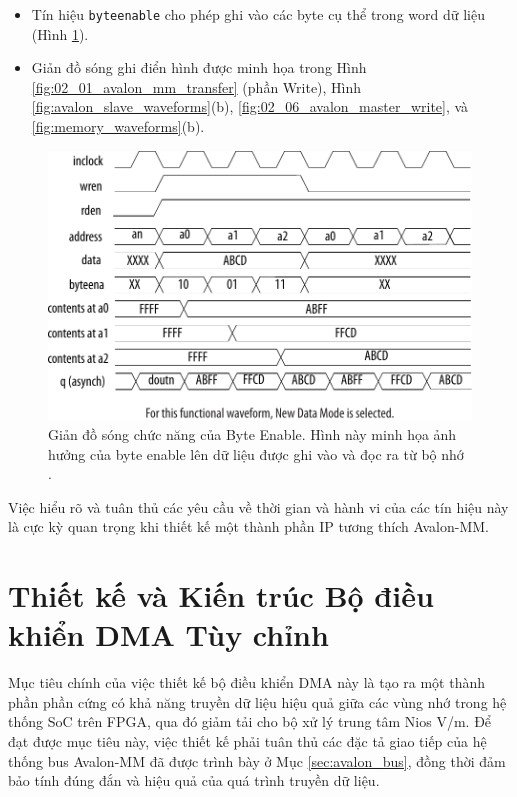 \begin{itemize}
\begin{itemize}
            \item Tín hiệu \texttt{byteenable} cho phép ghi vào các byte cụ thể trong word dữ liệu (Hình \ref{fig:02_02_memory_byteenable}).
            \item Giản đồ sóng ghi điển hình được minh họa trong Hình \ref{fig:02_01_avalon_mm_transfer} (phần Write), Hình \ref{fig:avalon_slave_waveforms}(b), \ref{fig:02_06_avalon_master_write}, và \ref{fig:memory_waveforms}(b).
        \end{itemize}
\end{itemize}

\begin{figure}[htbp]
    \centering
    \includegraphics[width=\linewidth]{Images/02_02_Memory_ByteEnable.pdf}
    \caption{Giản đồ sóng chức năng của Byte Enable. Hình này minh họa ảnh hưởng của byte enable lên dữ liệu được ghi vào và đọc ra từ bộ nhớ \cite{memory_byteenable}.}
    \label{fig:02_02_memory_byteenable} %
\end{figure}

Việc hiểu rõ và tuân thủ các yêu cầu về thời gian và hành vi của các tín hiệu này là cực kỳ quan trọng khi thiết kế một thành phần IP tương thích Avalon-MM.

\section{Thiết kế và Kiến trúc Bộ điều khiển DMA Tùy chỉnh}
\label{sec:dma_design_and_architecture} %
Mục tiêu chính của việc thiết kế bộ điều khiển DMA này là tạo ra một thành phần phần cứng có khả năng truyền dữ liệu hiệu quả giữa các vùng nhớ trong hệ thống SoC trên FPGA, qua đó giảm tải cho bộ xử lý trung tâm Nios V/m. Để đạt được mục tiêu này, việc thiết kế phải tuân thủ các đặc tả giao tiếp của hệ thống bus Avalon-MM đã được trình bày ở Mục \ref{sec:avalon_bus}, đồng thời đảm bảo tính đúng đắn và hiệu quả của quá trình truyền dữ liệu.

